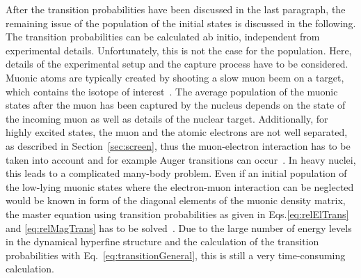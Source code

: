 After the transition probabilities have been discussed in the last paragraph, the remaining issue of the population of the initial states is discussed in the following.
The transition probabilities can be calculated ab initio, independent from experimental details. Unfortunately, this is not the case for the population. Here, details of the experimental setup and the capture process have to be considered. Muonic atoms are typically created by shooting a slow muon beem on a target, which contains the isotope of interest~\cite{wu1969,Devons1995,BorieRinker1982}. The average population of the muonic states after the muon has been captured by the nucleus depends on the state of the incoming muon as well as details of the nuclear target. Additionally, for highly excited states, the muon and the atomic electrons are not well separated, as described in Section~\ref{sec:screen}, thus the muon-electron interaction has to be taken into account and for example Auger transitions can occur~\cite{pisano1982}. In heavy nuclei, this leads to a complicated many-body problem. Even if an initial population of the low-lying muonic states where the electron-muon interaction can be neglected would be known in form of the diagonal elements of the muonic density matrix, the master equation using transition probabilities as given in Eqs.\eqref{eq:relElTrans} and \eqref{eq:relMagTrans} has to be solved~\cite{pisano1982}. Due to the large number of energy levels in the dynamical hyperfine structure and the calculation of the transition probabilities with Eq.~\eqref{eq:transitionGeneral}, this is still a very time-consuming calculation.

